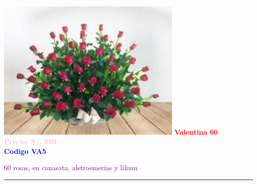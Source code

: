\begin{multicols}{2}
    \begin{minipage}{\linewidth}
        \centering
        \includegraphics[height=7cm]{imagenes_extraidas/image_11_4} %
        \newline
        \vspace{0.1cm}
        \textbf{\Large \textcolor{red}{Valentina 60}} \\ %
        \vspace{0.2cm}
        \textbf{\textcolor{pink}{Precio: S/. 350}} \\ %
        \vspace{0.2cm}
        \textbf{\textcolor{blue}{Codigo VA5}} \\ %
        \vspace{0.2cm}
        \begin{minipage}{0.8\linewidth} 
            \small \textcolor{purple}{60 rosas, en canasata, alstroemerias y lilium} %
        \end{minipage}
        \vspace{0.1cm}        
        \rule{\linewidth}{0.5pt}
    \end{minipage}
    \end{multicols}
